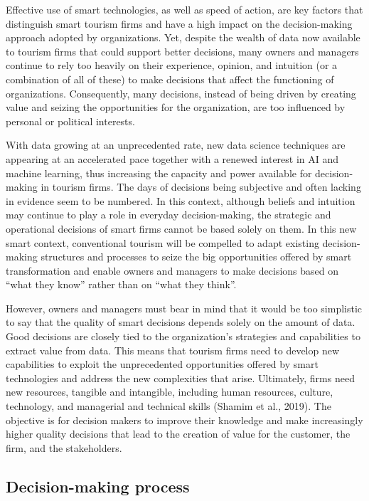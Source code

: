 \documentclass[
  letterpaper,
  DIV=11,
  numbers=noendperiod]{scrreprt}
\begin{document}
Effective use of smart technologies, as well as speed of action, are key
factors that distinguish smart tourism firms and have a high impact on
the decision-making approach adopted by organizations. Yet, despite the
wealth of data now available to tourism firms that could support better
decisions, many owners and managers continue to rely too heavily on
their experience, opinion, and intuition (or a combination of all of
these) to make decisions that affect the functioning of organizations.
Consequently, many decisions, instead of being driven by creating value
and seizing the opportunities for the organization, are too influenced
by personal or political interests.

With data growing at an unprecedented rate, new data science techniques
are appearing at an accelerated pace together with a renewed interest in
AI and machine learning, thus increasing the capacity and power
available for decision-making in tourism firms. The days of decisions
being subjective and often lacking in evidence seem to be numbered. In
this context, although beliefs and intuition may continue to play a role
in everyday decision-making, the strategic and operational decisions of
smart firms cannot be based solely on them. In this new smart context,
conventional tourism will be compelled to adapt existing decision-making
structures and processes to seize the big opportunities offered by smart
transformation and enable owners and managers to make decisions based on
``what they know'' rather than on ``what they think''.

However, owners and managers must bear in mind that it would be too
simplistic to say that the quality of smart decisions depends solely on
the amount of data. Good decisions are closely tied to the
organization's strategies and capabilities to extract value from data.
This means that tourism firms need to develop new capabilities to
exploit the unprecedented opportunities offered by smart technologies
and address the new complexities that arise. Ultimately, firms need new
resources, tangible and intangible, including human resources, culture,
technology, and managerial and technical skills (Shamim et al., 2019).
The objective is for decision makers to improve their knowledge and make
increasingly higher quality decisions that lead to the creation of value
for the customer, the firm, and the stakeholders.

\hypertarget{decision-making-process}{%
\subsection{Decision-making process}\label{decision-making-process}}
\end{document}
